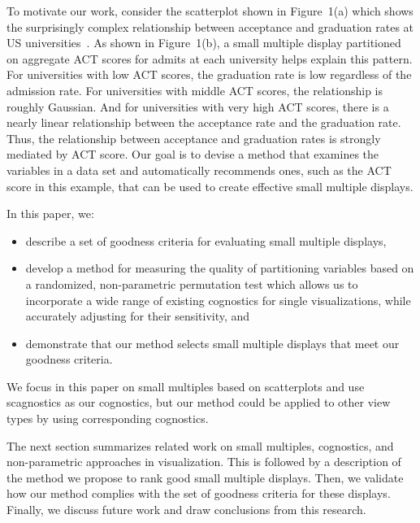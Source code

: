 To motivate our work, consider the scatterplot shown in Figure~1(a) which shows the surprisingly complex relationship between acceptance and graduation rates at US universities~\cite{IPEDS}. As shown in Figure~1(b), a small multiple display partitioned on aggregate ACT scores for admits at each university helps explain this pattern.
For universities with low ACT scores, the graduation rate is low regardless of the admission rate.
For universities with middle ACT scores, the relationship is roughly Gaussian.
And for universities with very high ACT scores, there is a nearly linear relationship between the acceptance rate and the graduation rate.
Thus, the relationship between acceptance and graduation rates is strongly mediated by ACT score.
Our goal is to devise a method that examines the variables in a data set and automatically recommends ones, such as the ACT score in this example, that can be used to create effective small multiple displays.


In this paper, we:
\begin{itemize}
    \item describe a set of goodness criteria for evaluating small multiple displays,
    \item develop a method for measuring the quality of partitioning variables based on a randomized, non-parametric permutation test which allows us to incorporate a wide range of existing cognostics for single visualizations, while accurately adjusting for their sensitivity, and
    \item demonstrate that our method selects small multiple displays that meet our goodness criteria.
\end{itemize}
We focus in this paper on small multiples based on scatterplots and use scagnostics as our cognostics, but our method could be applied to other view types by using corresponding cognostics.

The next section summarizes related work on small multiples, cognostics, and non-parametric approaches in visualization. This is followed by a description of the method we propose to rank good small multiple displays. Then, we validate how our method complies with the set of goodness criteria for these displays. Finally, we discuss future work and draw conclusions from this research.

